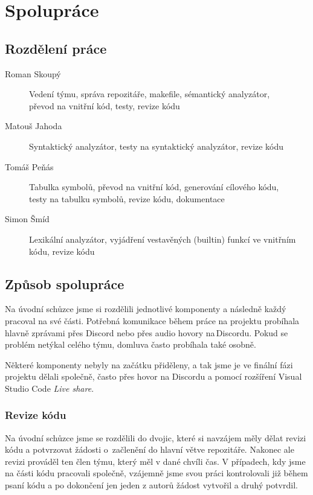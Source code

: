 \documentclass{article}
\begin{document}
    \newpage

    
    \tableofcontents
    \thispagestyle{empty}
    

    \newpage
    
    \section{Spolupráce}
        \subsection{Rozdělení práce}
            \begin{description}
                \item[Roman Skoupý] Vedení týmu, správa repozitáře, makefile, sémantický analyzátor, \\
                převod na vnitřní kód, testy, revize kódu
                \item[Matouš Jahoda] Syntaktický analyzátor, testy na syntaktický analyzátor, revize kódu
                \item[Tomáš Peňás] Tabulka symbolů, převod na vnitřní kód, generování cílového kódu, \\
                testy na tabulku symbolů, revize kódu, dokumentace
                \item[Simon Šmíd] Lexikální analyzátor, vyjádření vestavěných (builtin) funkcí ve vnitřním kódu, revize kódu
            \end{description}
            
        \subsection{Způsob spolupráce}
            Na úvodní schůzce jsme si rozdělili jednotlivé komponenty a následně každý pracoval na své části. Potřebná komunikace během práce na projektu probíhala hlavně zprávami přes Discord nebo přes audio hovory na\,Discordu. Pokud se problém netýkal celého týmu, domluva často probíhala také osobně.

            Některé komponenty nebyly na začátku přiděleny, a tak jsme je ve finální fázi projektu dělali společně, často přes hovor na Discordu a pomocí rozšíření Visual Studio Code \textit{Live share}.
            
            \subsubsection{Revize kódu}
                Na úvodní schůzce jsme se rozdělili do dvojic, které si navzájem měly dělat revizi kódu a potvrzovat žádosti o~začlenění do hlavní větve repozitáře. Nakonec ale revizi prováděl ten člen týmu, který měl v dané chvíli čas. V případech, kdy jsme na části kódu pracovali společně, vzájemně jsme svou práci kontrolovali již během psaní kódu a po dokončení jen jeden z autorů žádost vytvořil a druhý potvrdil.
\end{document}
